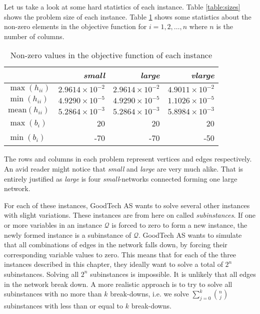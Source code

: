 Let us take a look at some hard statistics of each instance.
Table \ref{table:sizes} shows the problem size of each instance.
Table \ref{table:maxmin} shows some statistics about the non-zero elements in
the objective function for $i = 1,2,\ldots,n$ where $n$ is the number of
columns.
\begin{table}
    \centering
    \caption{Non-zero values in the objective function of each instance}
    \begin{tabular}{lrrr}
                        & \textit{small}          & \textit{large}          & \textit{vlarge} \\\hline
    $\max(h_{ii})$      & $2.9614 \times 10^{-2}$ & $2.9614 \times 10^{-2}$ & $4.9011 \times 10^{-2}$ \\
    $\min(h_{ii})$      & $4.9290 \times 10^{-5}$ & $4.9290 \times 10^{-5}$ & $1.1026 \times 10^{-5}$ \\
$\textrm{mean}(h_{ii})$ & $5.2864 \times 10^{-3}$ & $5.2864 \times 10^{-3}$ & $5.8984 \times 10^{-3}$ \\
    $\max(b_{i})$       & 20                      & 20                      & 20 \\
    $\min(b_{i})$       & -70                     & -70                     & -50 \\
    \end{tabular}
    \label{table:maxmin}
\end{table}
The rows and columns in each problem represent vertices and edges respectively.
An avid reader might notice that \textit{small} and \textit{large} are very
much alike.
That is entirely justified as \textit{large} is four \textit{small}-networks
connected forming one large network.

For each of these instances, GoodTech AS wants to solve several other instances
with slight variations.
These instances are from here on called \emph{subinstances}.
If one or more variables in an instance $\mathcal{Q}$ is forced to zero to form
a new instance, the newly formed instance is a subinstance of $\mathcal{Q}$.
GoodTech AS wants to simulate that all combinations of edges in the network
falls down, by forcing their corresponding variable values to zero.
This means that for each of the three instances described in this chapter,
they ideally want to solve a total of $2^n$ subinstances.
Solving all $2^n$ subinstances is  impossible.
It is unlikely that all edges in the network break down.
A more realistic approach is to try to solve all subinstances with no more than
$k$ break-downs, i.e. we solve $\sum_{j=0}^k {n \choose j}$ subinstances
with less than or equal to $k$ break-downs.

